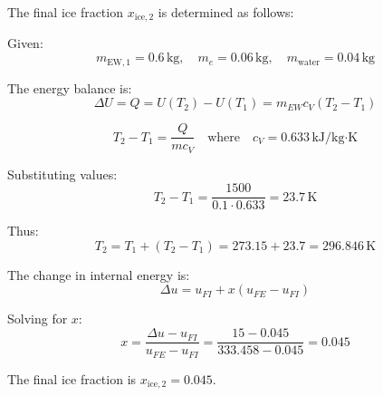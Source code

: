 The final ice fraction \( x_{\text{ice},2} \) is determined as follows:  

Given:  
\[
m_{\text{EW},1} = 0.6 \, \text{kg}, \quad m_e = 0.06 \, \text{kg}, \quad m_{\text{water}} = 0.04 \, \text{kg}
\]  

The energy balance is:  
\[
\Delta U = Q = U(T_2) - U(T_1) = m_{EW} c_V (T_2 - T_1)
\]  

\[
T_2 - T_1 = \frac{Q}{m c_V} \quad \text{where} \quad c_V = 0.633 \, \text{kJ/kg·K}
\]  

Substituting values:  
\[
T_2 - T_1 = \frac{1500}{0.1 \cdot 0.633} = 23.7 \, \text{K}
\]  

Thus:  
\[
T_2 = T_1 + (T_2 - T_1) = 273.15 + 23.7 = 296.846 \, \text{K}
\]  

The change in internal energy is:  
\[
\Delta u = u_{FI} + x (u_{FE} - u_{FI})
\]  

Solving for \( x \):  
\[
x = \frac{\Delta u - u_{FI}}{u_{FE} - u_{FI}} = \frac{15 - 0.045}{333.458 - 0.045} = 0.045
\]  

The final ice fraction is \( x_{\text{ice},2} = 0.045 \).